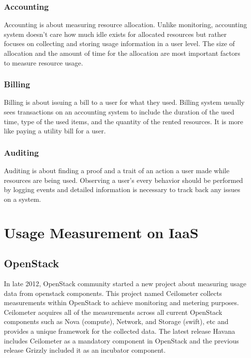 \documentclass{sig-alternate}
\begin{document}
\subsubsection{Accounting}

Accounting is about measuring resource allocation. Unlike monitoring, accounting system doesn't care how much idle exists for allocated resources but rather focuses on collecting and storing usage information in a user level. The size of allocation and the amount of time for the allocation are most important factors to measure resource usage. 

\subsubsection{Billing}

Billing is about issuing a bill to a user for what they used. Billing system usually sees transactions on an accounting system to include the duration of the used time, type of the used items, and the quantity of the rented resources. It is more like paying a utility bill for a user. 

\subsubsection{Auditing}

Auditing is about finding a proof and a trait of an action a user made while resources are being used. Observing a user's every behavior should be performed by logging events and detailed information is necessary to track back any issues on a system. 

\section{Usage Measurement on IaaS}

\subsection{OpenStack}

In late 2012, OpenStack community started a new project about measuring usage data from openstack components. This project named Ceilometer collects measurements within OpenStack to achieve monitoring and metering purposes. Ceilometer acquires all of the measurements across all current OpenStack components such as Nova (compute), Network, and Storage (swift), etc and provides a unique framework for the collected data. The latest release Havana includes Ceilometer as a mandatory component in OpenStack and the previous release Grizzly included it as an incubator component.
\end{document}

